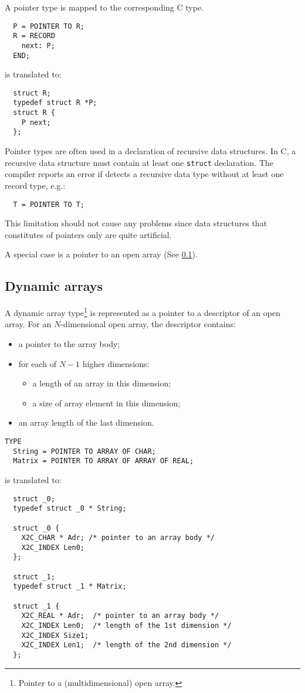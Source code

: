 A pointer type is mapped to the corresponding C type.
\begin{verbatim}
  P = POINTER TO R;
  R = RECORD
    next: P;
  END;
\end{verbatim}
is translated to:
\begin{verbatim}
  struct R;
  typedef struct R *P;
  struct R {
    P next;
  };
\end{verbatim}

Pointer types are often used in a declaration of recursive data
structures. In C, a recursive data structure must contain at
least one {\tt struct} declaration. The compiler reports an error
if detects a recursive data type without at least one record type, e.g.:
\begin{verbatim}
  T = POINTER TO T;
\end{verbatim}

This limitation should not cause any problems since data
structures that constitutes of pointers only are quite artificial.

A special case is a pointer to an open array (See
\ref{maptoc:dynarr}).

\subsection{Dynamic arrays}\label{maptoc:dynarr}

A dynamic array type\footnote{Pointer to a (multidimensional) open
array.} is represented as a pointer to a descriptor of an open array.
For an $N$-dimensional open array, the descriptor
contains:
\begin{itemize}
\item a pointer to the array body;
\item for each of $N-1$ higher dimensions:
  \begin{itemize}
  \item a length of an array in this dimension;
  \item a size of array element in this dimension;
  \end{itemize}
\item an array length of the last dimension.
\end{itemize}

\Example
\begin{verbatim}
TYPE
  String = POINTER TO ARRAY OF CHAR;
  Matrix = POINTER TO ARRAY OF ARRAY OF REAL;
\end{verbatim}
is translated to:
\begin{verbatim}
  struct _0;
  typedef struct _0 * String;

  struct _0 {
    X2C_CHAR * Adr; /* pointer to an array body */
    X2C_INDEX Len0;
  };

  struct _1;
  typedef struct _1 * Matrix;

  struct _1 {
    X2C_REAL * Adr;  /* pointer to an array body */
    X2C_INDEX Len0;  /* length of the 1st dimension */
    X2C_INDEX Size1;
    X2C_INDEX Len1;  /* length of the 2nd dimension */
  };
\end{verbatim}

